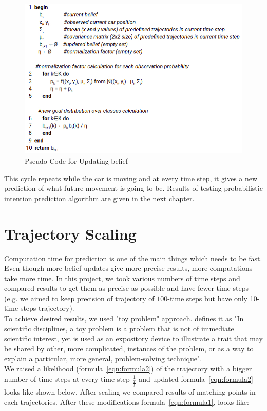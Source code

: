 \begin{figure}[H]
	\centering  	
	\includegraphics[width=13cm]{img/pseudoBeliefUpdate.jpg}
	\caption{Pseudo Code for Updating belief}
	\label{fig:PseudoBelief}    
\end{figure}

This cycle repeats while the car is moving and at every time step, it gives a new prediction of what future movement is going to be. Results of testing probabilistic intention prediction algorithm are given in the next chapter.

\section{Trajectory Scaling}

Computation time for prediction is one of the main things which needs to be fast. Even though more belief updates give more precise results, more computations take more time. In this project, we took various numbers of time steps and compared results to get them as precise as possible and have fewer time steps (e.g. we aimed to keep precision of trajectory of $100$-time steps but have only 10-time steps trajectory). \\
To achieve desired results, we used "toy problem" approach. \cite{ToyPr} defines it as "In scientific disciplines, a toy problem is a problem that is not of immediate scientific interest, yet is used as an expository device to illustrate a trait that may be shared by other, more complicated, instances of the problem, or as a way to explain a particular, more general, problem-solving technique". \\
We raised a likelihood (formula~\ref{eqn:formula2}) of the trajectory with a bigger number of time steps at every time step $\frac{1}{\frac{T}{t}}$ and updated formula~\ref{eqn:formula2} looks like shown below. After scaling we compared results of matching points in each trajectories. After these modifications formula~\ref{eqn:formula1}, looks like: 

